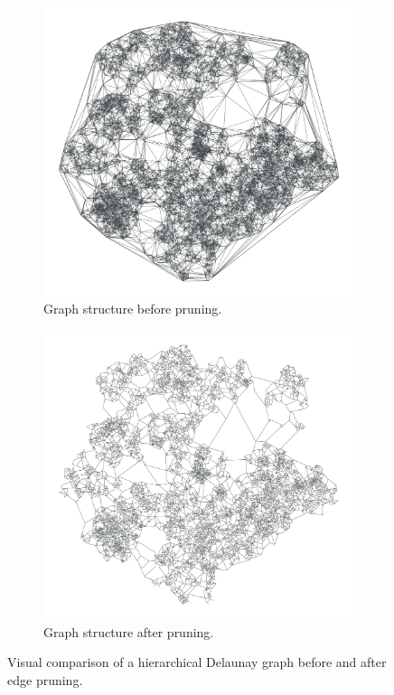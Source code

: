 \begin{figure}[tbhp]
	\centering
	\begin{subfigure}[t]{0.45\linewidth}
		\centering
		\includegraphics[width=\linewidth]{graphics/delaunay_pre_prune.png}
		\caption{Graph structure before pruning.}
		\label{fig:delaunay_pre_prune_viz}
	\end{subfigure}
	\hfill
	\begin{subfigure}[t]{0.45\linewidth}
		\centering
		\includegraphics[width=\linewidth]{graphics/delaunay_post_prune.png}
		\caption{Graph structure after pruning.}
		\label{fig:delaunay_post_prune_viz}
	\end{subfigure}
	\caption{Visual comparison of a hierarchical Delaunay graph before and after edge pruning.}
	\label{fig:delaunay_vs_no_pruning_graph}
\end{figure}

